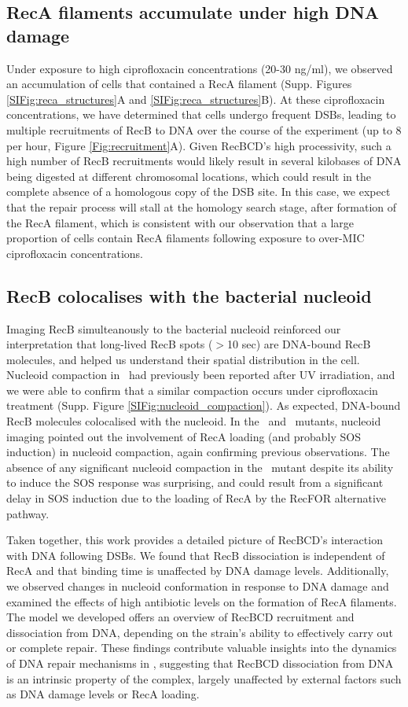 \subsection*{RecA filaments accumulate under high DNA damage}
Under exposure to high ciprofloxacin concentrations (20-30 ng/ml), we observed an accumulation of cells that contained a RecA filament (Supp. Figures \ref{SIFig:reca_structures}A and \ref{SIFig:reca_structures}B). At these ciprofloxacin concentrations, we have determined that cells undergo frequent DSBs, leading to multiple recruitments of RecB to DNA over the course of the experiment (up to 8 per hour, Figure \ref{Fig:recruitment}A). Given RecBCD's high processivity\cite{Wiktor2018}, such a high number of RecB recruitments would likely result in several kilobases of DNA being digested at different chromosomal locations, which could result in the complete absence of a homologous copy of the DSB site. In this case, we expect that the repair process will stall at the homology search stage, after formation of the RecA filament, which is consistent with our observation that a large proportion of cells contain RecA filaments following exposure to over-MIC ciprofloxacin concentrations.

\subsection*{RecB colocalises with the bacterial nucleoid}
Imaging RecB simulteanously to the bacterial nucleoid reinforced our interpretation that long-lived RecB spots ($>$10 sec) are DNA-bound RecB molecules, and helped us understand their spatial distribution in the cell. Nucleoid compaction in \ecoli\ had previously been reported after UV irradiation\cite{Odsbu2014}, and we were able to confirm that a similar compaction occurs under ciprofloxacin treatment (Supp. Figure \ref{SIFig:nucleoid_compaction}). As expected, DNA-bound RecB molecules colocalised with the nucleoid. In the \dreca\ and \geneteneighty\ mutants, nucleoid imaging pointed out the involvement of RecA loading (and probably SOS induction) in nucleoid compaction, again confirming previous observations\cite{Odsbu2014}. The absence of any significant nucleoid compaction in the \geneteneighty\ mutant despite its ability to induce the SOS response was surprising, and could result from a significant delay in SOS induction due to the loading of RecA by the RecFOR alternative pathway.

Taken together, this work provides a detailed picture of RecBCD's interaction with DNA following DSBs. We found that RecB dissociation is independent of RecA and that binding time is unaffected by DNA damage levels. Additionally, we observed changes in nucleoid conformation in response to DNA damage and examined the effects of high antibiotic levels on the formation of RecA filaments. The model we developed offers an overview of RecBCD recruitment and dissociation from DNA, depending on the strain's ability to effectively carry out or complete repair.
These findings contribute valuable insights into the dynamics of DNA repair mechanisms in \ecoli, suggesting that RecBCD dissociation from DNA is an intrinsic property of the complex, largely unaffected by external factors such as DNA damage levels or RecA loading.